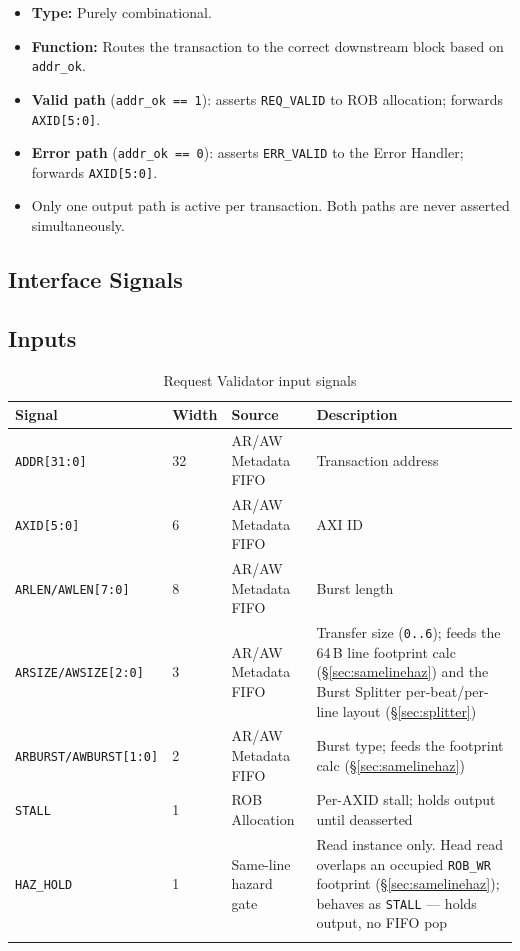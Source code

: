 \begin{itemize}
  \item \textbf{Type:} Purely combinational.
  \item \textbf{Function:} Routes the transaction to the correct
        downstream block based on \texttt{addr\_ok}.
  \item \textbf{Valid path} (\texttt{addr\_ok == 1}): asserts
        \texttt{REQ\_VALID} to ROB allocation; forwards
        \texttt{AXID[5:0]}.
  \item \textbf{Error path} (\texttt{addr\_ok == 0}): asserts
        \texttt{ERR\_VALID} to the Error Handler; forwards
        \texttt{AXID[5:0]}.
  \item Only one output path is active per transaction. Both paths are
        never asserted simultaneously.
\end{itemize}

\subsection{Interface Signals}

\subsection{Inputs}

\begin{longtable}{llll}
\toprule
\textbf{Signal} & \textbf{Width} & \textbf{Source} & \textbf{Description} \\
\midrule
\texttt{ADDR[31:0]}        & 32 & AR/AW Metadata FIFO & Transaction address \\
\texttt{AXID[5:0]}         & 6  & AR/AW Metadata FIFO & AXI ID \\
\texttt{ARLEN/AWLEN[7:0]}  & 8  & AR/AW Metadata FIFO & Burst length \\
\texttt{ARSIZE/AWSIZE[2:0]} & 3 & AR/AW Metadata FIFO & Transfer size (\texttt{0..6}); feeds the 64\,B line footprint calc (\S\ref{sec:samelinehaz}) and the Burst Splitter per-beat/per-line layout (\S\ref{sec:splitter}) \\
\texttt{ARBURST/AWBURST[1:0]} & 2 & AR/AW Metadata FIFO & Burst type; feeds the footprint calc (\S\ref{sec:samelinehaz}) \\
\texttt{STALL}             & 1  & ROB Allocation      & Per-AXID stall; holds output until deasserted \\
\texttt{HAZ\_HOLD}         & 1  & Same-line hazard gate & Read instance only. Head read overlaps an occupied \texttt{ROB\_WR} footprint (\S\ref{sec:samelinehaz}); behaves as \texttt{STALL} --- holds output, no FIFO pop \\
\bottomrule
\caption{Request Validator input signals}
\end{longtable}

